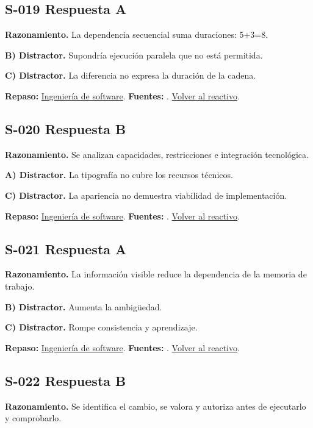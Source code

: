 \subsection*{S-019 \quad Respuesta A}\label{s:S-019}
\textbf{Razonamiento.} La dependencia secuencial suma duraciones: 5+3=8.

\textbf{B) Distractor. }Supondría ejecución paralela que no está permitida.

\textbf{C) Distractor. }La diferencia no expresa la duración de la cadena.

\textbf{Repaso:} \hyperref[sec:s1]{Ingeniería de software}. \textbf{Fuentes:} \cite{scrum,swebok}. \hyperref[q:S-019]{Volver al reactivo}.\par\medskip

\subsection*{S-020 \quad Respuesta B}\label{s:S-020}
\textbf{Razonamiento.} Se analizan capacidades, restricciones e integración tecnológica.

\textbf{A) Distractor. }La tipografía no cubre los recursos técnicos.

\textbf{C) Distractor. }La apariencia no demuestra viabilidad de implementación.

\textbf{Repaso:} \hyperref[sec:s1]{Ingeniería de software}. \textbf{Fuentes:} \cite{scrum,swebok}. \hyperref[q:S-020]{Volver al reactivo}.\par\medskip

\subsection*{S-021 \quad Respuesta A}\label{s:S-021}
\textbf{Razonamiento.} La información visible reduce la dependencia de la memoria de trabajo.

\textbf{B) Distractor. }Aumenta la ambigüedad.

\textbf{C) Distractor. }Rompe consistencia y aprendizaje.

\textbf{Repaso:} \hyperref[sec:s1]{Ingeniería de software}. \textbf{Fuentes:} \cite{scrum,swebok}. \hyperref[q:S-021]{Volver al reactivo}.\par\medskip

\subsection*{S-022 \quad Respuesta B}\label{s:S-022}
\textbf{Razonamiento.} Se identifica el cambio, se valora y autoriza antes de ejecutarlo y comprobarlo.

